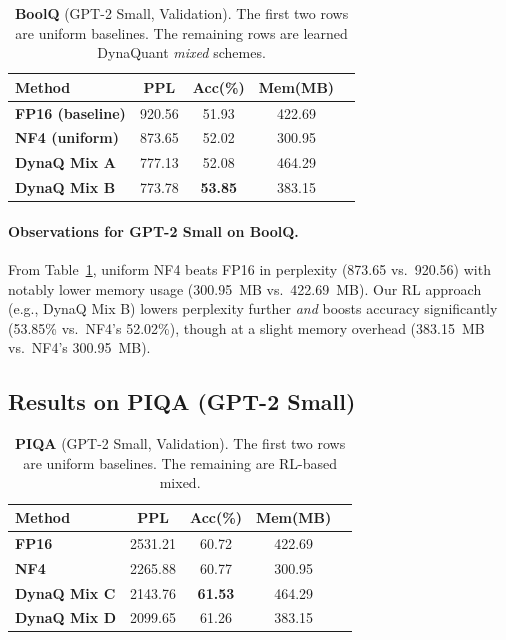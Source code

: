 \documentclass{article}
\begin{document}
	\begin{table}[ht]
		\centering
		\caption{\small \textbf{BoolQ} (GPT-2 Small, Validation). The first two rows are uniform baselines. The remaining rows are learned DynaQuant \emph{mixed} schemes.}
		\label{tab:boolq-small}
		\begin{tabular}{lcccc}
			\toprule
			\textbf{Method} & \textbf{PPL} & \textbf{Acc(\%)} & \textbf{Mem(MB)} \\
			\midrule
			\textbf{FP16 (baseline)}  & 920.56 & 51.93 & 422.69 \\
			\textbf{NF4 (uniform)}    & 873.65 & 52.02 & 300.95 \\
			\midrule
			\textbf{DynaQ Mix A}      & 777.13 & 52.08 & 464.29 \\
			\textbf{DynaQ Mix B}      & 773.78 & \textbf{53.85} & 383.15 \\
			\bottomrule
		\end{tabular}
		\vspace{-1em}
	\end{table}
	
	\paragraph{Observations for GPT-2 Small on BoolQ.}
	From Table~\ref{tab:boolq-small}, uniform NF4 beats FP16 in perplexity (873.65 vs.\ 920.56) with notably lower memory usage (300.95~MB vs.\ 422.69~MB). Our RL approach (e.g., DynaQ Mix B) lowers perplexity further \emph{and} boosts accuracy significantly (53.85\% vs.\ NF4’s 52.02\%), though at a slight memory overhead (383.15~MB vs.\ NF4’s 300.95~MB).
	
	\subsection{Results on PIQA (GPT-2 Small)}
	\label{sec:piqa-small}
	
	\begin{table}[ht]
		\centering
		\caption{\small \textbf{PIQA} (GPT-2 Small, Validation). The first two rows are uniform baselines. The remaining are RL-based mixed.}
		\label{tab:piqa-small}
		\begin{tabular}{lcccc}
			\toprule
			\textbf{Method} & \textbf{PPL} & \textbf{Acc(\%)} & \textbf{Mem(MB)} \\
			\midrule
			\textbf{FP16}    & 2531.21 & 60.72 & 422.69 \\
			\textbf{NF4}     & 2265.88 & 60.77 & 300.95 \\
			\midrule
			\textbf{DynaQ Mix C} & 2143.76 & \textbf{61.53} & 464.29 \\
			\textbf{DynaQ Mix D} & 2099.65 & 61.26 & 383.15 \\
			\bottomrule
		\end{tabular}
		\vspace{-0.5em}
	\end{table}
	
\end{document}
